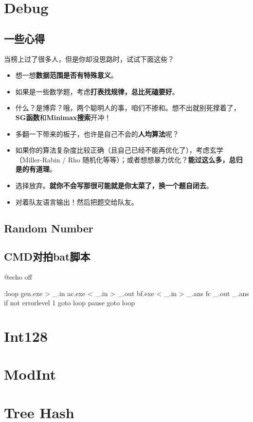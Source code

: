 \section{Debug}
\setlength{\parskip}{0.5em}

\subsection{一些心得}
当榜上过了很多人，但是你却没思路时，试试下面这些？
\begin{itemize}
  \setlength{\itemsep}{0.5ex}
  \item 想一想{\textbf{数据范围是否有特殊意义}}。
  \item 如果是一些数学题，考虑{\textbf{打表找规律，总比死磕要好}}。
  \item 什么？是博弈？哦，两个聪明人的事，咱们不掺和。想不出就别死撑着了，{\textbf{SG函数}和\textbf{Minimax搜索}}开冲！
  \item 多翻一下带来的板子，也许是自己不会的{\textbf{人均算法}}呢？
  \item 如果你的算法复杂度比较正确（且自己已经不能再优化了），考虑玄学（Miller-Rabin / Rho 随机化等等）；或者想想暴力优化？{\textbf{能过这么多，总归是的有道理}}。
  \item 选择放弃。{\textbf{就你不会写那很可能就是你太菜了，换一个题自闭去}}。
  \item 对着队友语言输出！然后把题交给队友。
\end{itemize}

\subsection{Random Number}

\subsection{CMD对拍bat脚本}
\begin{cpplist}
@echo off

:loop
  gen.exe > _.in
  ac.exe < _.in > _.out
  bf.exe < _.in > _.ans
  fc _.out _.ans
if not errorlevel 1 goto loop
pause
goto loop
\end{cpplist}

\section{Int128}

\section{ModInt}

\section{Tree Hash}
